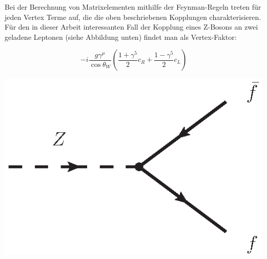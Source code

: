 Bei der Berechnung von Matrixelementen mithilfe der Feynman-Regeln treten
für jeden Vertex Terme auf, die die oben beschriebenen Kopplungen
charakterisieren. Für den in dieser Arbeit interessanten Fall der Kopplung
eines Z-Bosons an zwei geladene Leptonen (siehe Abbildung
unten) findet man als Vertex-Faktor: \\
\begin{minipage}{0.6\textwidth}
\begin{equation}
    -i \frac{g\gamma^\mu}{\cos\theta_W} \left( \frac{1+\gamma^5}{2} c_R
        + \frac{1-\gamma^5}{2} c_L \right)
    \label{eq:coupling}
\end{equation}
\end{minipage}
\hfill
\begin{minipage}{0.3\textwidth}
    \includegraphics[width=1.0\textwidth]{img/NCvertex}
\end{minipage}
\newline


